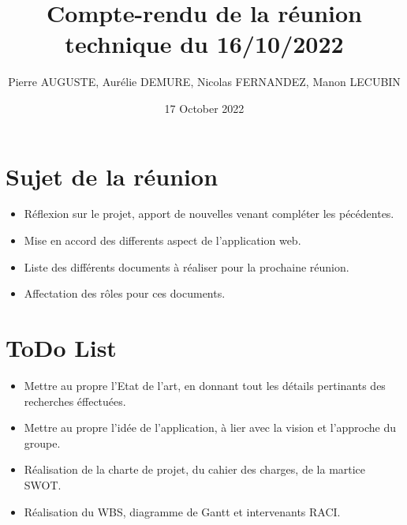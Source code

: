 \documentclass{article}
\title{Compte-rendu de la réunion technique du 16/10/2022}
\author{Pierre AUGUSTE, Aurélie DEMURE, Nicolas FERNANDEZ, Manon LECUBIN}
\date{17 October 2022}
\begin{document}
\maketitle

\section{Sujet de la réunion}

\begin{itemize}
    \item Réflexion sur le projet, apport de nouvelles venant compléter les pécédentes.
    \item Mise en accord des differents aspect de l'application web.
    \item Liste des différents documents à réaliser pour la prochaine réunion.
    \item Affectation des rôles pour ces documents.
\end{itemize}

\section{ToDo List}
\begin{itemize}
    \item Mettre au propre l'Etat de l'art, en donnant tout les détails pertinants des recherches éffectuées.
    \item Mettre au propre l'idée de l'application, à lier avec la vision et l'approche du groupe.
    \item Réalisation de la charte de projet, du cahier des charges, de la martice SWOT.
    \item Réalisation du WBS, diagramme de Gantt et intervenants RACI.
\end{itemize}
\end{document}
